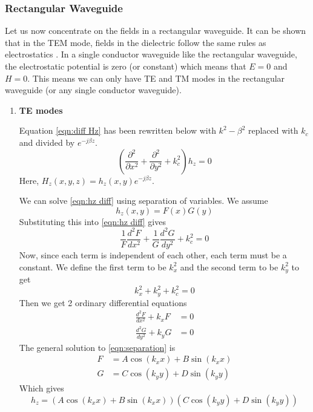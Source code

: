\subsubsection{Rectangular Waveguide}

Let us now concentrate on the fields in a rectangular waveguide. It can be shown that in the TEM mode, fields in the dielectric follow the same rules as electrostatics \cite{Pozar2009}. In a single conductor waveguide like the rectangular waveguide, the electrostatic potential is zero (or constant) which means that $E=0$ and $H=0$. This means we can only have TE and TM modes in the rectangular waveguide (or any single conductor waveguide).

\begin{enumerate}
\item \textbf{TE modes}

Equation \ref{eqn:diff Hz} has been rewritten below with $k^2-\beta^2$ replaced with $k_c$ and divided by $e^{-j\beta z}$.
\begin{equation}
\left(\frac{\partial^2}{\partial x^2}+\frac{\partial^2}{\partial y^2}+k_c^2\right)h_z=0
\label{eqn:hz diff}
\end{equation}
Here, $H_z(x,y,z)=h_z(x,y)e^{-j\beta z}$.

We can solve \ref{eqn:hz diff} using separation of variables. We assume
\begin{equation}
h_z(x,y)=F(x)G(y)
\end{equation}
Substituting this into \ref{eqn:hz diff} gives
\begin{equation}
\frac{1}{F}\frac{d^2F}{dx^2}+\frac{1}{G}\frac{d^2G}{dy^2}+k_c^2=0
\end{equation}
Now, since each term is independent of each other, each term must be a constant. We define the first term to be $k_x^2$ and the second term to be $k_y^2$ to get 
\begin{equation}
k_x^2+k_y^2+k_c^2=0
\end{equation}
Then we get 2 ordinary differential equations
\begin{subequations}
\label{eqn:separation}
\begin{align}
\frac{d^2F}{dx^2}+k_xF& =0\\
\frac{d^2G}{dy^2}+k_yG& =0
\end{align}
\end{subequations}
The general solution to \ref{eqn:separation} is
\begin{subequations}
\begin{align}
F& =A\cos(k_xx)+B\sin(k_xx)\\
G& =C\cos(k_yy)+D\sin(k_yy)
\end{align}
\end{subequations}
Which gives
\begin{equation}
h_z =(A\cos(k_xx)+B\sin(k_xx))(C\cos(k_yy)+D\sin(k_yy))
\label{eqn:hz general}
\end{equation}


\end{enumerate}
